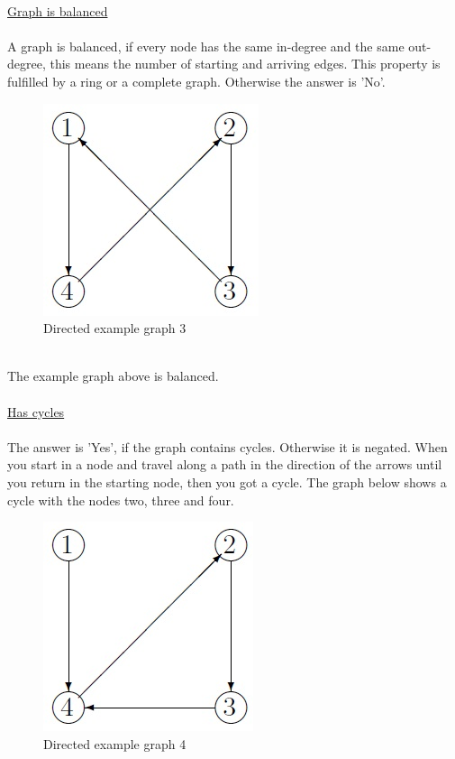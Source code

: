 \documentclass[12pt]{report}
\begin{document}
\\
\underline{Graph is balanced}\\
\\
A graph is balanced, if every node has the same in-degree and the same out-degree, this means the number of starting and arriving edges. This property is fulfilled by a ring or a complete graph. Otherwise the answer is 'No'.\\
\begin{figure}[h]
\centering
\includegraphics[scale=.6]{graph6}
\caption{Directed example graph 3}
\label{FIG:abb50}
\end{figure}
\\
The example graph above is balanced.\\
\\
\underline{Has cycles}\\
\\
The answer is 'Yes', if the graph contains cycles. Otherwise it is negated. When you start in a node and travel along a path in the direction of the arrows until you return in the starting node, then you got a cycle. The graph below shows a cycle with the nodes two, three and four.\\
\begin{figure}[h]
\centering
\includegraphics[scale=.6]{graph7}
\caption{Directed example graph 4}
\label{FIG:abb51}
\end{figure}
\end{document}
